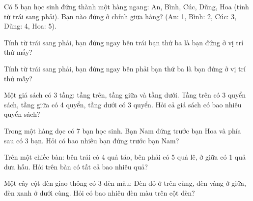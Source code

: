 \begin{ex}
Có 5 bạn học sinh đứng thành một hàng ngang: An, Bình, Cúc, Dũng, Hoa (tính từ trái sang phải). Bạn nào đứng ở chính giữa hàng? (An: 1, Bình: 2, Cúc: 3, Dũng: 4, Hoa: 5).
\end{ex}

\begin{ex}
Tính từ trái sang phải, bạn đứng ngay bên trái bạn thứ ba là bạn đứng ở vị trí thứ mấy?
\end{ex}

\begin{ex}
Tính từ trái sang phải, bạn đứng ngay bên phải bạn thứ ba là bạn đứng ở vị trí thứ mấy?
\end{ex}

\begin{ex}
Một giá sách có 3 tầng: tầng trên, tầng giữa và tầng dưới. Tầng trên có 3 quyển sách, tầng giữa có 4 quyển, tầng dưới có 3 quyển. Hỏi cả giá sách có bao nhiêu quyển sách?
\end{ex}

\begin{ex}
Trong một hàng dọc có 7 bạn học sinh. Bạn Nam đứng trước bạn Hoa và phía sau có 3 bạn. Hỏi có bao nhiêu bạn đứng trước bạn Nam?
\end{ex}

\begin{ex}
Trên một chiếc bàn: bên trái có 4 quả táo, bên phải có 5 quả lê, ở giữa có 1 quả dưa hấu. Hỏi trên bàn có tất cả bao nhiêu quả?
\end{ex}

\begin{ex}
Một cây cột đèn giao thông có 3 đèn màu: Đèn đỏ ở trên cùng, đèn vàng ở giữa, đèn xanh ở dưới cùng. Hỏi có bao nhiêu đèn màu trên cột đèn?
\end{ex}

